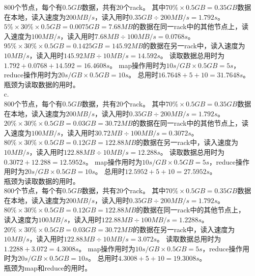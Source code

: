 \documentclass[UTF8]{ctexart}
\begin{document}
800个节点，每个有$0.5GB$数据，共有20个rack。
其中$70\%\times0.5GB=0.35GB$数据在本地，读入速度为$200MB/s$，读入用时$0.35GB\div200MB/s=1.792s$。
$5\%\times30\%\times0.5GB=0.0075GB=7.68MB$的数据在同一rack中的其他节点上，读入速度为$100MB/s$，读入用时$7.68MB\div100MB/s=0.0768s$。
$95\%\times30\%\times0.5GB=0.1425GB=145.92MB$的数据在另一rack中，读入速度为$10MB/s$，读入用时$145.92MB\div10MB/s=14.592s$。
读取数据总用时为$1.792+0.0768+14.592=16.4608s$。
map操作用时为$10s/GB\times0.5GB=5s$，reduce操作用时为$20s/GB\times0.5GB=10s$。
总用时$16.7648+5+10=31.7648s$。\\

瓶颈为读取数据的用时。\\

c.\\
800个节点，每个有$0.5GB$数据，共有20个rack。
其中$70\%\times0.5GB=0.35GB$数据在本地，读入速度为$200MB/s$，读入用时$0.35GB\div200MB/s=1.792s$。
$20\%\times30\%\times0.5GB=0.03GB=30.72MB$的数据在同一rack中的其他节点上，读入速度为$100MB/s$，读入用时$30.72MB\div100MB/s=0.3072s$。
$80\%\times30\%\times0.5GB=0.12GB=122.88MB$的数据在另一rack中，读入速度为$10MB/s$，读入用时$122.88MB\div10MB/s=12.288s$。
读取数据总用时为$0.3072+12.288=12.5952s$。
map操作用时为$10s/GB\times0.5GB=5s$，reduce操作用时为$20s/GB\times0.5GB=10s$。
总用时$12.5952+5+10=27.5952s$。\\
瓶颈为读取数据的用时。\\

800个节点，每个有$0.5GB$数据，共有20个rack。
其中$70\%\times0.5GB=0.35GB$数据在本地，读入速度为$200MB/s$，读入用时$0.35GB\div200MB/s=1.792s$。
$80\%\times30\%\times0.5GB=0.12GB=122.88MB$的数据在同一rack中的其他节点上，读入速度为$100MB/s$，读入用时$122.88MB\div100MB/s=1.2288s$。
$20\%\times30\%\times0.5GB=0.03GB=30.72MB$的数据在另一rack中，读入速度为$10MB/s$，读入用时$122.88MB\div10MB/s=3.072s$。
读取数据总用时为$1.2288+3.072=4.3008s$。
map操作用时为$10s/GB\times0.5GB=5s$，reduce操作用时为$20s/GB\times0.5GB=10s$。
总用时$4.3008+5+10=19.3008s$。\\
瓶颈为map和reduce的用时。\\
\end{document}
